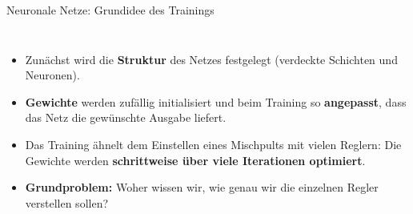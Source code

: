 \begin{frame}{Neuronale Netze: Grundidee des Trainings}

\begin{columns}

\begin{itemize}
    \item Zunächst wird die \textbf{Struktur} des Netzes festgelegt
          (verdeckte Schichten und Neuronen).

    \item \textbf{Gewichte} werden zufällig initialisiert und beim Training so \textbf{angepasst},
          dass das Netz die gewünschte Ausgabe liefert.

    \item Das Training ähnelt dem Einstellen eines Mischpults mit
          vielen Reglern: Die Gewichte werden \textbf{schrittweise über
          viele Iterationen optimiert}.
    \item \textbf{Grundproblem:} Woher wissen wir, wie genau wir die einzelnen Regler verstellen sollen?
\end{itemize}


\centering
{}

\end{columns}
\end{frame}

